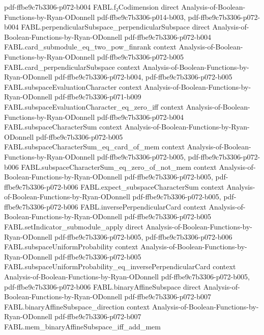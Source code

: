 \begin{theorem}
  {pdf-ffbe9c7b3306-p072-b004}
\proofstep
  {FABL.f₂Codimension}
  {direct}
  {Analysis-of-Boolean-Functions-by-Ryan-ODonnell}
  {pdf-ffbe9c7b3306-p014-b003,
    pdf-ffbe9c7b3306-p072-b004}
\proofstep
  {FABL.perpendicularSubspace_perpendicularSubspace}
  {direct}
  {Analysis-of-Boolean-Functions-by-Ryan-ODonnell}
  {pdf-ffbe9c7b3306-p072-b004}
\proofstep
  {FABL.card_submodule_eq_two_pow_finrank}
  {context}
  {Analysis-of-Boolean-Functions-by-Ryan-ODonnell}
  {pdf-ffbe9c7b3306-p072-b005}
\proofstep
  {FABL.card_perpendicularSubspace}
  {context}
  {Analysis-of-Boolean-Functions-by-Ryan-ODonnell}
  {pdf-ffbe9c7b3306-p072-b004,
    pdf-ffbe9c7b3306-p072-b005}
\proofstep
  {FABL.subspaceEvaluationCharacter}
  {context}
  {Analysis-of-Boolean-Functions-by-Ryan-ODonnell}
  {pdf-ffbe9c7b3306-p071-b009}
\proofstep
  {FABL.subspaceEvaluationCharacter_eq_zero_iff}
  {context}
  {Analysis-of-Boolean-Functions-by-Ryan-ODonnell}
  {pdf-ffbe9c7b3306-p072-b004}
\proofstep
  {FABL.subspaceCharacterSum}
  {context}
  {Analysis-of-Boolean-Functions-by-Ryan-ODonnell}
  {pdf-ffbe9c7b3306-p072-b005}
\proofstep
  {FABL.subspaceCharacterSum_eq_card_of_mem}
  {context}
  {Analysis-of-Boolean-Functions-by-Ryan-ODonnell}
  {pdf-ffbe9c7b3306-p072-b005,
    pdf-ffbe9c7b3306-p072-b006}
\proofstep
  {FABL.subspaceCharacterSum_eq_zero_of_not_mem}
  {context}
  {Analysis-of-Boolean-Functions-by-Ryan-ODonnell}
  {pdf-ffbe9c7b3306-p072-b005,
    pdf-ffbe9c7b3306-p072-b006}
\proofstep
  {FABL.expect_subspaceCharacterSum}
  {context}
  {Analysis-of-Boolean-Functions-by-Ryan-ODonnell}
  {pdf-ffbe9c7b3306-p072-b005,
    pdf-ffbe9c7b3306-p072-b006}
\proofstep
  {FABL.inversePerpendicularCard}
  {context}
  {Analysis-of-Boolean-Functions-by-Ryan-ODonnell}
  {pdf-ffbe9c7b3306-p072-b005}
\proofstep
  {FABL.setIndicator_submodule_apply}
  {direct}
  {Analysis-of-Boolean-Functions-by-Ryan-ODonnell}
  {pdf-ffbe9c7b3306-p072-b005,
    pdf-ffbe9c7b3306-p072-b006}
\proofstep
  {FABL.subspaceUniformProbability}
  {context}
  {Analysis-of-Boolean-Functions-by-Ryan-ODonnell}
  {pdf-ffbe9c7b3306-p072-b005}
\proofstep
  {FABL.subspaceUniformProbability_eq_inversePerpendicularCard}
  {context}
  {Analysis-of-Boolean-Functions-by-Ryan-ODonnell}
  {pdf-ffbe9c7b3306-p072-b005,
    pdf-ffbe9c7b3306-p072-b006}
\proofstep
  {FABL.binaryAffineSubspace}
  {direct}
  {Analysis-of-Boolean-Functions-by-Ryan-ODonnell}
  {pdf-ffbe9c7b3306-p072-b007}
\proofstep
  {FABL.binaryAffineSubspace_direction}
  {context}
  {Analysis-of-Boolean-Functions-by-Ryan-ODonnell}
  {pdf-ffbe9c7b3306-p072-b007}
\proofstep
  {FABL.mem_binaryAffineSubspace_iff_add_mem}

\end{theorem}
